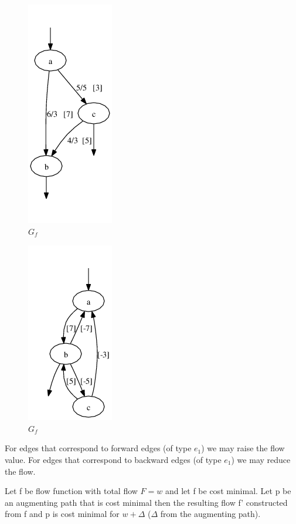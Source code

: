 \begin{example}

\begin{figure}[h]
\includegraphics[scale=0.5]{diagrams/graph5_10}
\caption{$G{_f}$}
\label{fig:G12}
\end{figure}

\begin{figure}[h]
\includegraphics[scale=0.5]{diagrams/graph5_11}
\caption{$G{_f}$}
\label{fig:G13}
\end{figure}


For edges that correspond to forward edges (of type $e{_1}$) we may raise the flow value.
For edges that correspond to backward edges (of type $e{_1}$) we may reduce the flow.

\end{example}



\begin{lemma}
Let f be  flow function with total flow $F=w$ and let f be cost minimal. Let p be an augmenting path that is cost minimal then the resulting flow f' constructed from f and p is cost minimal for $w+\Delta$ ($\Delta$ from the augmenting path).
\end{lemma}


